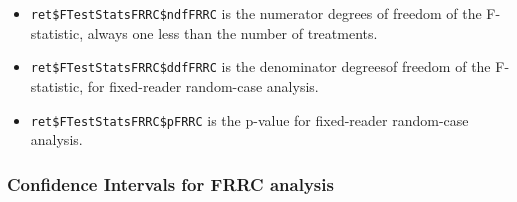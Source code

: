 \documentclass[]{book}
\newenvironment{Shaded}{\begin{snugshade}}{\end{snugshade}}
\newcommand{\CommentTok}[1]{\textcolor[rgb]{0.56,0.35,0.01}{\textit{#1}}}
\newcommand{\NormalTok}[1]{#1}
\newcommand{\OperatorTok}[1]{\textcolor[rgb]{0.81,0.36,0.00}{\textbf{#1}}}
\providecommand{\tightlist}{%
  \setlength{\itemsep}{0pt}\setlength{\parskip}{0pt}}
\begin{document}
\begin{Shaded}
\end{Shaded}

\begin{itemize}
\tightlist
\item
  \texttt{ret\$FTestStatsFRRC\$ndfFRRC} is the numerator degrees of freedom of the F-statistic, always one less than the number of treatments.
\end{itemize}

\begin{Shaded}
\end{Shaded}

\begin{itemize}
\tightlist
\item
  \texttt{ret\$FTestStatsFRRC\$ddfFRRC} is the denominator degreesof freedom of the F-statistic, for fixed-reader random-case analysis.
\end{itemize}

\begin{Shaded}
\end{Shaded}

\begin{itemize}
\tightlist
\item
  \texttt{ret\$FTestStatsFRRC\$pFRRC} is the p-value for fixed-reader random-case analysis.
\end{itemize}

\begin{Shaded}
\end{Shaded}

\hypertarget{confidence-intervals-for-frrc-analysis}{%
\subsubsection{Confidence Intervals for FRRC analysis}\label{confidence-intervals-for-frrc-analysis}}
\end{document}
